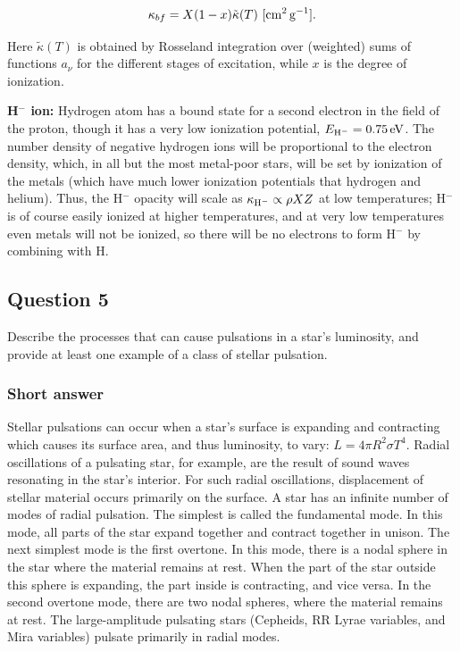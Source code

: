 \documentclass[a4paper,10pt]{article}
\begin{document}
\begin{align*}
    \kappa_{bf} = X(1-x)\tilde{\kappa}(T) ~ [{\rm cm^2\,g^{-1}}].
\end{align*}

{\noindent}Here $\tilde{\kappa}(T)$ is obtained by Rosseland integration over (weighted) sums of functions $a_\nu$ for the different stages of excitation, while $x$ is the degree of ionization.

{\noindent}\textbf{H$^-$ ion:} Hydrogen atom has a bound state for a second electron in the field of the proton, though it has a very low ionization potential, $E_{{\rm H}^-}=0.75\,{\rm eV}$. The number density of negative hydrogen ions will be proportional to the electron density, which, in all but the most metal-poor stars, will be set by ionization of the metals (which have much lower ionization potentials that hydrogen and helium). Thus, the H$^-$ opacity will scale as $\kappa_{{\rm H}^-} \propto \rho XZ$ at low temperatures; H$^-$ is of course easily ionized at higher temperatures, and at very low temperatures even metals will not be ionized, so there will be no electrons to form H$^-$ by combining with H.


\newpage
\subsection{Question 5}

Describe the processes that can cause pulsations in a star's luminosity, and provide at least one example of a class of stellar pulsation.

\subsubsection{Short answer}

Stellar pulsations can occur when a star's surface is expanding and contracting which causes its surface area, and thus luminosity, to vary: $L=4\pi R^2\sigma T^4$. Radial oscillations of a pulsating star, for example, are the result of sound waves resonating in the star's interior. For such radial oscillations, displacement of stellar material occurs primarily on the surface. A star has an infinite number of modes of radial pulsation.  The simplest is called the fundamental mode. In this mode, all parts of the star expand together and contract together in unison. The next simplest mode is the first overtone. In this mode, there is a nodal sphere in the star where the material remains at rest. When the part of the star outside this sphere is expanding, the part inside is contracting, and vice versa. In the second overtone mode, there are two nodal spheres, where the material remains at rest.  The large-amplitude pulsating stars (Cepheids, RR Lyrae variables, and Mira variables) pulsate primarily in radial modes.
\end{document}

